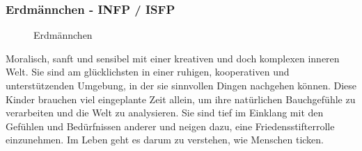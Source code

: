 \subsubsection{Erdmännchen - INFP / ISFP}
\begin{figure}[H]
	\centering
	\caption[Erdmännchen]{Erdmännchen \cite{knowAndLove}}
	\label{img:Elephant}
\end{figure}
\glqq Moralisch, sanft und sensibel mit einer kreativen und doch komplexen inneren Welt. Sie sind am glücklichsten in einer ruhigen, kooperativen und unterstützenden Umgebung, in der sie sinnvollen Dingen nachgehen können. Diese Kinder brauchen viel eingeplante Zeit allein, um ihre natürlichen Bauchgefühle zu verarbeiten und die Welt zu analysieren. Sie sind tief im Einklang mit den Gefühlen und Bedürfnissen anderer und neigen dazu, eine Friedensstifterrolle einzunehmen. Im Leben geht es darum zu verstehen, wie Menschen ticken. \grqq \cite{knowAndLove}
